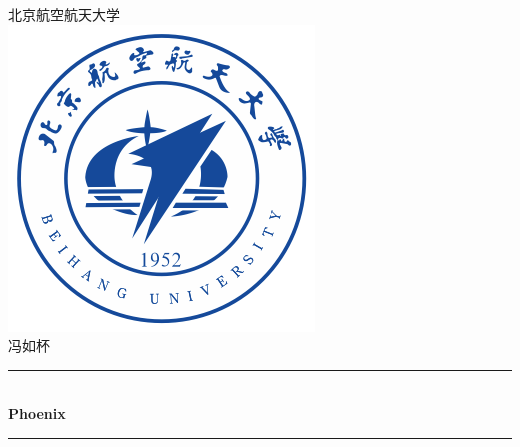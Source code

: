 \begin{titlepage}

\newcommand{\HRule}{\rule{\linewidth}{0.5mm}} %

\center %
 

\textsc{\LARGE  北京航空航天大学}\\[1.5cm] %
\includegraphics[scale=0.9]{figure/buaa_logo.png}\\[1cm] %
\textsc{\Large 冯如杯}\\[0.5cm] %


\HRule \\[1cm]
{ \huge  \bfseries Phoenix}\\[0.4cm] %
\HRule \\[1cm]
 


\end{titlepage}
